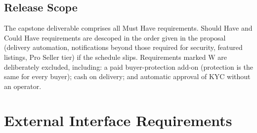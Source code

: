 \documentclass[11pt,a4paper]{report}
\begin{document}
\section{Release Scope}
The capstone deliverable comprises all Must Have requirements. Should Have and Could Have requirements are descoped in the order given in the proposal (delivery automation, notifications beyond those required for security, featured listings, Pro Seller tier) if the schedule slips. Requirements marked W are deliberately excluded, including: a paid buyer-protection add-on (protection is the same for every buyer); cash on delivery; and automatic approval of KYC without an operator.
\chapter{External Interface Requirements}
\label{ch:ifc}
\end{document}
